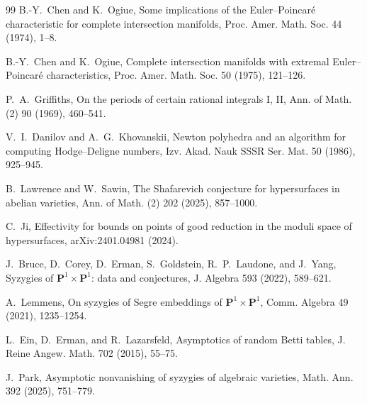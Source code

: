 \documentclass[11pt]{article}
\theoremstyle{definition}
\begin{document}
\begin{thebibliography}{99}
 B.-Y.~Chen and K.~Ogiue, Some implications of the Euler--Poincar\'e characteristic for complete intersection manifolds, Proc. Amer. Math. Soc. 44 (1974), 1--8.

 B.-Y.~Chen and K.~Ogiue, Complete intersection manifolds with extremal Euler--Poincar\'e characteristics, Proc. Amer. Math. Soc. 50 (1975), 121--126.

 P.~A.~Griffiths, On the periods of certain rational integrals I, II, Ann. of Math. (2) 90 (1969), 460--541.

 V.~I.~Danilov and A.~G.~Khovanskii, Newton polyhedra and an algorithm for computing Hodge--Deligne numbers, Izv. Akad. Nauk SSSR Ser. Mat. 50 (1986), 925--945.

 B.~Lawrence and W.~Sawin, The Shafarevich conjecture for hypersurfaces in abelian varieties, Ann. of Math. (2) 202 (2025), 857--1000.

 C.~Ji, Effectivity for bounds on points of good reduction in the moduli space of hypersurfaces, arXiv:2401.04981 (2024).

 J.~Bruce, D.~Corey, D.~Erman, S.~Goldstein, R.~P.~Laudone, and J.~Yang, Syzygies of $\mathbf P^1\times\mathbf P^1$: data and conjectures, J. Algebra 593 (2022), 589--621.

 A.~Lemmens, On syzygies of Segre embeddings of $\mathbf P^1\times\mathbf P^1$, Comm. Algebra 49 (2021), 1235--1254.

 L.~Ein, D.~Erman, and R.~Lazarsfeld, Asymptotics of random Betti tables, J. Reine Angew. Math. 702 (2015), 55--75.

 J.~Park, Asymptotic nonvanishing of syzygies of algebraic varieties, Math. Ann. 392 (2025), 751--779.


\end{thebibliography}
\end{document}
